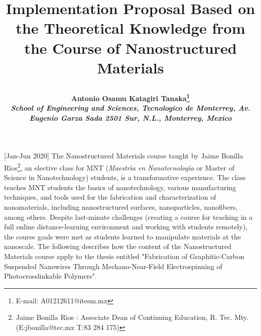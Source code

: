 \documentclass[11pt]{article}
\makeatletter
\def\NormalBaseline{\def\baselinestretch{1.1}}
\def\@shorttitle{\@empty}
\def\shorttitle#1{\gdef\@shorttitle{#1}}
\makeatother
\begin{document}
\renewcommand*\rmdefault{bch}\normalfont\upshape

\shorttitle{PROPOSAL - Nanostructured Materials}

\date{}  

  
\title{\NormalBaseline\raggedright\bfseries Implementation Proposal Based on the Theoretical Knowledge from the Course of Nanostructured Materials}
  
      	\def\AuAffLabelStyle#1{\textsuperscript{\upshape#1}}
        \def\AuFont{\bfseries\large}
        \def\AuSep{, }
        \def\AffSep{\\}
        \let\origthanks\thanks
\renewcommand\thanks[1]{\begingroup\let\rlap\relax\origthanks{#1}\endgroup}
\author{\hskip2pc\parbox{.95\linewidth}{\AuFont Antonio Osamu Katagiri Tanaka\AuAffLabelStyle{1}\thanks{E-mail: A01212611@itesm.mx}
      \\[3pt] 
    \normalfont\itshape\NormalBaseline \AuAffLabelStyle{1} 
    School of Engineering and Sciences\unskip, 
    Tecnologico de Monterrey\unskip, \normalfont\itshape\NormalBaseline Av. Eugenio Garza Sada 2501 Sur\unskip, N.L.\unskip, Monterrey\unskip, Mexico}}
    
    
\maketitle 
\pagestyle{custom}
[Jan-Jun 2020] The Nanostructured Materials course taught by Jaime Bonilla R\'{\i}os\footnote{Jaime Bonilla R\'{\i}os : Associate Dean of Continuing Education, R. Tec. Mty. (E:jbonilla@tec.mx T:83 284 175)}, an elective class for MNT (\textit{Maestr\'{\i}a en Nanotecnolog\'{\i}a} or Master of Science in Nanotechnology) students, is a transformative experience. The class teaches MNT students the basics of nanotechnology, various manufacturing techniques, and tools used for the fabrication and characterization of nanomaterials, including nanostructured surfaces, nanoparticles, nanofibers, among others. Despite last-minute challenges (creating a course for teaching in a full online distance-learning environment and working with students remotely), the course goals were met as students learned to manipulate materials at the nanoscale. The following describes how the content of the Nanostructured Materials course apply to the thesis entitled "Fabrication of Graphitic-Carbon Suspended Nanowires Through Mechano-Near-Field Electrospinning of Photocrosslinkable Polymers".
\end{document}
